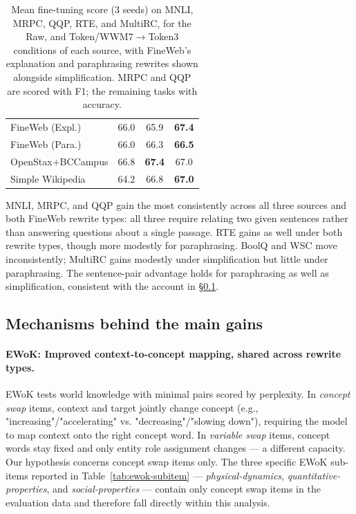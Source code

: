 \documentclass[11pt]{article}
\begin{document}
\begin{table}[t]
\begin{tabular}{lccc}
FineWeb (Expl.)    & 66.0 & 65.9 & \textbf{67.4} \\
FineWeb (Para.)    & 66.0 & 66.3 & \textbf{66.5} \\
OpenStax+BCCampus  & 66.8 & \textbf{67.4} & 67.0 \\
Simple Wikipedia   & 64.2 & 66.8 & \textbf{67.0} \\
\bottomrule
\end{tabular}
\caption{Mean fine-tuning score (3 seeds) on MNLI, MRPC, QQP, RTE, and MultiRC, for the Raw, and Token/WWM7$\to$Token3 conditions of each source, with FineWeb's explanation and paraphrasing rewrites shown alongside simplification. MRPC and QQP are scored with F1; the remaining tasks with accuracy.}
\label{tab:glue-subtask}
\end{table}

MNLI, MRPC, and QQP gain the most consistently across all three sources and both FineWeb rewrite types: all three require relating two given sentences rather than answering questions about a single passage. RTE gains as well under both rewrite types, though more modestly for paraphrasing. BoolQ and WSC move inconsistently; MultiRC gains modestly under simplification but little under paraphrasing. The sentence-pair advantage holds for paraphrasing as well as simplification, consistent with the account in \S\ref{sec:ewok-mechanism}.

\subsection{Mechanisms behind the main gains}
\label{sec:ewok-mechanism}

\paragraph{EWoK: Improved context-to-concept mapping, shared across rewrite types.} EWoK \citep{ewok2024} tests world knowledge with minimal pairs scored by perplexity. In \emph{concept swap} items, context and target jointly change concept (e.g., "increasing"/"accelerating" vs. "decreasing"/"slowing down"), requiring the model to map context onto the right concept word. In \emph{variable swap} items, concept words stay fixed and only entity role assignment changes --- a different capacity. Our hypothesis concerns concept swap items only. The three specific EWoK sub-items reported in Table~\ref{tab:ewok-subitem} --- \emph{physical-dynamics}, \emph{quantitative-properties}, and \emph{social-properties} --- contain only concept swap items in the evaluation data and therefore fall directly within this analysis.
\end{document}
